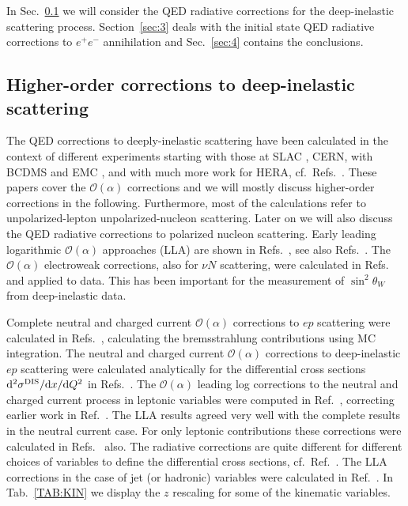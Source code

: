 In Sec.~\ref{sec:2} we will consider the QED radiative corrections for 
the deep-inelastic scattering process. Section~\ref{sec:3} deals with the initial state QED radiative corrections 
to $e^+ e^-$ annihilation and Sec.~\ref{sec:4} contains the conclusions.

\subsection{Higher-order corrections to deep-inelastic scattering}\label{sec:2}


\vspace*{1mm}
\noindent
The QED corrections to deeply-inelastic scattering have been calculated in the context of different
experiments starting with those at SLAC \cite{Mo:1968cg}, CERN, with BCDMS and EMC 
\cite{Bardin:1980ii}, and with much more work for HERA, cf.~Refs.~\cite{Kwiatkowski:1990es,Arbuzov:1995id}.
These papers cover the $\mathcal{O}(\alpha)$ corrections and we will mostly discuss higher-order corrections in the 
following. Furthermore, most of the calculations refer to unpolarized-lepton unpolarized-nucleon 
scattering. Later on we will
also discuss the QED radiative corrections to polarized nucleon scattering. Early leading logarithmic  $\mathcal{O}(\alpha)$ 
approaches (LLA) are shown in Refs.~\cite{Mo:1968cg,DeRujula:1979grv,Consoli:1980nm}, see also Refs.~\cite{Kuraev:1985hb,
Kuraev:1988xn,Fadin:1989dw}. The $\mathcal{O}(\alpha)$ electroweak 
corrections, also for $\nu N$ scattering, were calculated in Refs.~\cite{Marciano:1980pb,Sarantakos:1982bp,
LlewellynSmith:1981tgo,Wheater:1982yk,Paschos:1981zx,Wirbel:1982cw,Liede:1983hw,Bardin:1986bc,Diener:2003ss,
Arbuzov:2004zr,Diener:2005me,Park:2009ft,NuTeV:2001whx} and applied to data. This has been important for the 
measurement of $\sin^2\theta_W$ from deep-inelastic data.

Complete neutral and charged current $\mathcal{O}(\alpha)$ corrections to $ep$ scattering were calculated in Refs.~\cite{Bohm:1986na,Bohm:1987cg,Spiesberger:1990fa}, calculating the bremsstrahlung contributions using MC 
integration. The neutral and charged current $\mathcal{O}(\alpha)$ corrections to deep-inelastic $ep$ scattering were
calculated analytically for the differential cross sections $\mathrm{d}^2 \sigma^{\rm DIS}/\mathrm{d} x/\mathrm{d} Q^2$ in 
Refs.~\cite{Bardin:1987rz,Bardin:1988by,Bardin:1989vz}. The $\mathcal{O}(\alpha)$ leading log corrections to the neutral and 
charged current process in leptonic variables were computed in Ref.~\cite{Blumlein:1989gk}, correcting earlier work in Ref.~\cite{Kripfganz:1987yu}.
The LLA results agreed very well with the complete results in the neutral current case. For only leptonic 
contributions these corrections were calculated in Refs.~\cite{Beenakker:1989km,Montagna:1991ku} also. The radiative 
corrections are quite different for different choices of variables to define the differential cross sections, 
cf.~Ref.~\cite{Blumlein:2012bf}. The LLA corrections in the case of jet (or hadronic) variables were calculated 
in Ref.~\cite{Blumlein:1990wz}. In Tab.~\ref{TAB:KIN} we display the $z$ rescaling for some of the kinematic 
variables.

